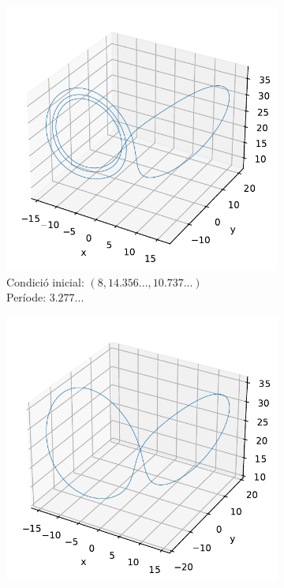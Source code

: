 \documentclass[a4paper]{article}
\theoremstyle{definition}
\begin{document}
\begin{figure}[ht]
  \captionsetup[subfigure]{justification=centering}
  \centering
  \begin{subfigure}[b]{0.45\linewidth}
    \centering
    \includegraphics[width=0.95\linewidth]{Images/op3-25-1.pdf}
    \caption{Condició inicial: $(8, 14.356..., 10.737...)$\\ Període: $3.277...$}
  \end{subfigure}
  \hfill
  \begin{subfigure}[b]{0.45\linewidth}
    \centering
    \includegraphics[width=0.95\linewidth]{Images/op3-25-2.pdf}

\end{subfigure}
\end{figure}
\end{document}

